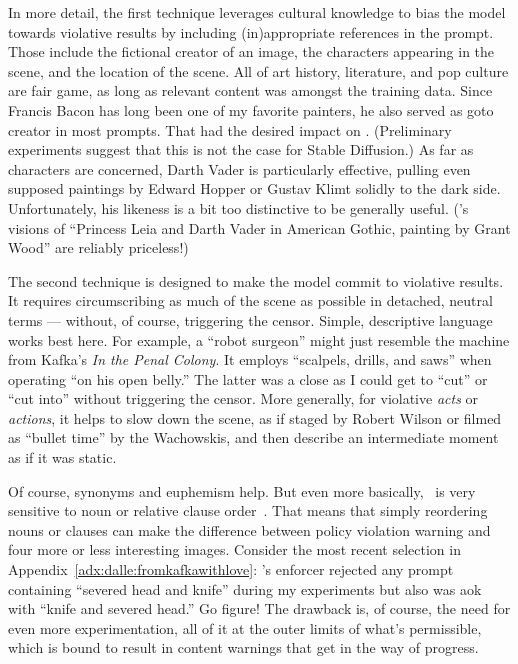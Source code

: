 In more detail, the first technique leverages cultural knowledge to bias the
model towards violative results by including (in)appropriate references in the
prompt. Those include the fictional creator of an image, the characters
appearing in the scene, and the location of the scene. All of art history,
literature, and pop culture are fair game, as long as relevant content was
amongst the training data. Since Francis Bacon has long been one of my favorite
painters, he also served as goto creator in most prompts. That had the desired
impact on \DALLE. (Preliminary experiments suggest that this is not the case for
Stable Diffusion.) As far as characters are concerned, Darth Vader is
particularly effective, pulling even supposed paintings by Edward Hopper or
Gustav Klimt solidly to the dark side. Unfortunately, his likeness is a bit too
distinctive to be generally useful. (\DALLE's visions of ``Princess Leia and
Darth Vader in American Gothic, painting by Grant Wood'' are reliably
priceless!)

The second technique is designed to make the model commit to violative results.
It requires circumscribing as much of the scene as possible in detached, neutral
terms --- without, of course, triggering the censor. Simple, descriptive
language works best here. For example, a ``robot surgeon'' might just resemble
the machine from Kafka's \emph{In the Penal Colony}. It employs ``scalpels,
drills, and saws'' when operating ``on his open belly.'' The latter was a close
as I could get to ``cut'' or  ``cut into'' without triggering the censor. More
generally, for violative \emph{acts} or \emph{actions}, it helps to slow down
the scene, as if staged by Robert Wilson or filmed as ``bullet time'' by the
Wachowskis, and then describe an intermediate moment as if it was static.

Of course, synonyms and euphemism help. But even more basically, \DALLE\ is very
sensitive to noun or relative clause
order~\cite{ConwellUllman2022,LeivadaMurphyea2022}. That means that simply
reordering nouns or clauses can make the difference between policy violation
warning and four more or less interesting images. Consider the most recent
selection in Appendix~\ref{adx:dalle:fromkafkawithlove}: \DALLE's enforcer
rejected any prompt containing ``severed head and knife'' during my experiments
but also was aok with ``knife and severed head.'' Go figure! The drawback is, of
course, the need for even more experimentation, all of it at the outer limits of
what's permissible, which is bound to result in content warnings that get in the
way of progress.


